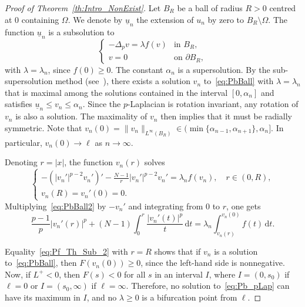 \documentclass[10pt,twoside,english,reqno,a4paper]{amsart}
\theoremstyle{plain}
\theoremstyle{plain}
\theoremstyle{definition}
\theoremstyle{remark}
\numberwithin{equation}{section}
\newcommand{\oL}{L^+}
\begin{document}
\begin{proof}[Proof of Theorem~\ref{th:Intro_NonExist}]
Let $B_R$ be a ball of radius $R>0$ centred at $0$ containing $\Omega$. We denote by $\underline u_n$ the extension of $u_n$ by zero to $B_R\setminus\Omega$. The function $\underline u_n$ is a subsolution to
\begin{equation}
	\label{eq:PbBall}
	\begin{cases}
		-\Delta_p v = \lambda f(v) & \text{in } B_R,\\
		v=0 & \text{on } \partial B_R,
	\end{cases}
\end{equation}
with $\lambda=\lambda_n$, since $f(0)\geq 0$. The constant $\alpha_{n}$ is a supersolution. By the sub-supersolution method (see~\cite[Theorems~1.3--1.4 and Remark~1.5]{LS06}), there exists a solution $v_n$ to~\eqref{eq:PbBall} with $\lambda=\lambda_{n}$ that is maximal among the solutions contained in the interval $[0,\alpha_n]$ and satisfies $\underline u_n \leq v_n \leq \alpha_n$. Since the \mbox{$p$-Laplacian} is rotation invariant, any rotation of $v_n$ is also a solution. The maximality of $v_n$ then implies that it must be radially symmetric. Note that $v_n(0)=\|v_n\|_{L^\infty(B_R)} \in (\min\{\alpha_{n-1}, \alpha_{n+1}\}, \alpha_n]$. In particular, $v_n(0)\to \ell$ as $n \to \infty$.

Denoting $r=|x|$, the function $v_n(r)$ solves
\begin{equation}
	\label{eq:PbBall2}
	\begin{cases}
		-\left( |v_n'|^{p-2} v_n' \right)' - \frac{N-1}{r} |v_n'|^{p-2} v_n' = \lambda_{n} f(v_n), \quad r\in (0,R),\\
		v_n(R)= v_n'(0) =0.
	\end{cases}
\end{equation}
Multiplying~\eqref{eq:PbBall2} by $-v_n'$ and integrating from $0$ to $r$, one gets
\begin{equation}
\label{eq:Pf_Th_Sub_2}
\frac{p-1}{p} |v_n'(r)|^p + (N-1) \int_0^r \frac{|v_n'(t)|^p}{t} \, \mathrm{d}t = \lambda_n \int_{v_n(r)}^{v_n(0)} f(t)\, \mathrm{d}t.
\end{equation}

Equality~\eqref{eq:Pf_Th_Sub_2} with $r=R$ shows that if $v_n$ is a solution to~\eqref{eq:PbBall}, then $F(v_n(0))\geq 0$, since the left-hand side is nonnegative. Now, if $\oL<0$, then $F(s)<0$ for all $s$ in an interval $I$, where $I=(0,s_0)$ if $\ell=0$ or $I=(s_0,\infty)$ if $\ell=\infty$. Therefore, no solution to~\eqref{eq:Pb_pLap} can have its maximum in $I$, and no $\lambda\geq 0$ is a bifurcation point from $\ell$.


\end{proof}
\end{document}

